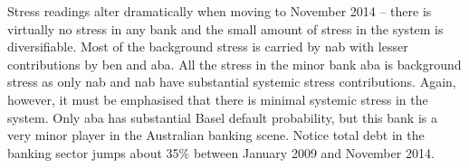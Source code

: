 \documentclass[authoryear]{elsarticle}
\begin{document}
Stress readings  alter dramatically when moving to November 2014 -- there is virtually no stress in any bank and the small amount of  stress in the system is diversifiable.    Most of the  background stress is carried by nab with lesser contributions by ben and aba.    All the stress in the minor bank aba is background stress as only nab and nab have substantial systemic stress contributions.   Again, however, it must be emphasised that there is minimal systemic stress in the system.    Only aba has substantial Basel default probability, but this bank is a very minor player in the Australian banking scene.   Notice total debt in the banking sector  jumps about 35\% between January 2009 and November 2014.
\end{document}
